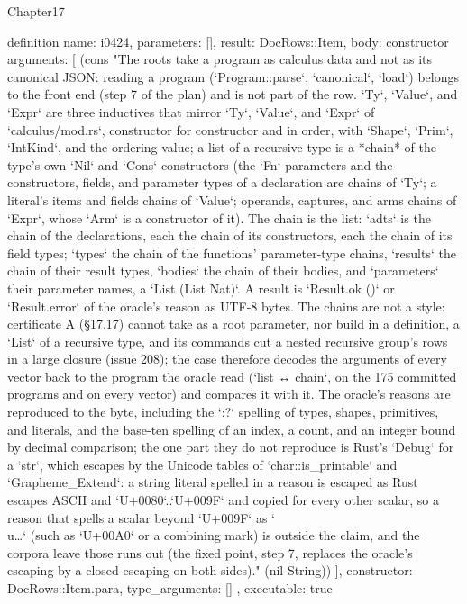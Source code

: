 \begin{lexlean}{Chapter17}
\begin{semanticmodule}
definition{
  name: i0424,
  parameters: [],
  result: DocRows::Item,
  body: constructor{
    arguments: [
      (cons "The roots take a program as calculus data and not as its canonical JSON: reading a program (`Program::parse`, `canonical`, `load`) belongs to the front end (step 7 of the plan) and is not part of the row. `Ty`, `Value`, and `Expr` are three inductives that mirror `Ty`, `Value`, and `Expr` of `calculus/mod.rs`, constructor for constructor and in order, with `Shape`, `Prim`, `IntKind`, and the ordering value; a list of a recursive type is a *chain* of the type's own `Nil` and `Cons` constructors (the `Fn` parameters and the constructors, fields, and parameter types of a declaration are chains of `Ty`; a literal's items and fields chains of `Value`; operands, captures, and arms chains of `Expr`, whose `Arm` is a constructor of it). The chain is the list: `adts` is the chain of the declarations, each the chain of its constructors, each the chain of its field types; `types` the chain of the functions' parameter-type chains, `results` the chain of their result types, `bodies` the chain of their bodies, and `parameters` their parameter names, a `List (List Nat)`. A result is `Result.ok ()` or `Result.error` of the oracle's reason as UTF-8 bytes. The chains are not a style: certificate A (§17.17) cannot take as a root parameter, nor build in a definition, a `List` of a recursive type, and its commands cut a nested recursive group's rows in a large closure (issue 208); the case therefore decodes the arguments of every vector back to the program the oracle read (`list ↔ chain`, on the 175 committed programs and on every vector) and compares it with it. The oracle's reasons are reproduced to the byte, including the `{:?}` spelling of types, shapes, primitives, and literals, and the base-ten spelling of an index, a count, and an integer bound by decimal comparison; the one part they do not reproduce is Rust's `Debug` for a `str`, which escapes by the Unicode tables of `char::is_printable` and `Grapheme_Extend`: a string literal spelled in a reason is escaped as Rust escapes ASCII and `U+0080`..`U+009F` and copied for every other scalar, so a reason that spells a scalar beyond `U+009F` as `\\u{…}` (such as `U+00A0` or a combining mark) is outside the claim, and the corpora leave those runs out (the fixed point, step 7, replaces the oracle's escaping by a closed escaping on both sides)." (nil String))
    ],
    constructor: DocRows::Item.para,
    type_arguments: []
  },
  executable: true
}


\end{semanticmodule}
\end{lexlean}
